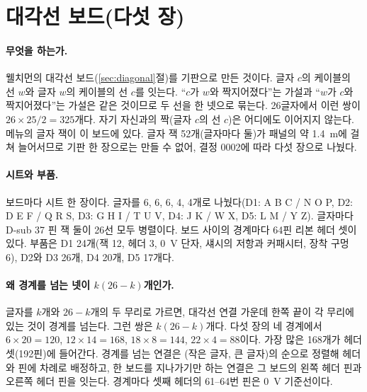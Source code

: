 
\section{대각선 보드(다섯 장)}\label{sch:diagonal}

\paragraph{무엇을 하는가.} 웰치먼의 대각선 보드(\ref{sec:diagonal}절)를 기판으로 만든 것이다. 글자 $c$의 케이블의
선 $w$와 글자 $w$의 케이블의 선 $c$를 잇는다. ``$c$가 $w$와 짝지어졌다''는 가설과 ``$w$가 $c$와 짝지어졌다''는 가설은
같은 것이므로 두 선을 한 넷으로 묶는다. 26글자에서 이런 쌍이 $26 \times 25 / 2 = 325$개다. 자기 자신과의 짝(글자 $c$의
선 $c$)은 어디에도 이어지지 않는다. 메뉴의 글자 잭이 이 보드에 있다. 글자 잭 52개(글자마다 둘)가 패널의 약 1.4~m에
걸쳐 늘어서므로 기판 한 장으로는 만들 수 없어, 결정 0002에 따라 다섯 장으로 나눴다.

\paragraph{시트와 부품.} 보드마다 시트 한 장이다. 글자를 6, 6, 6, 4, 4개로 나눴다(D1: A B C / N O P, D2: D E F / Q R
S, D3: G H I / T U V, D4: J K / W X, D5: L M / Y Z). 글자마다 D-sub 37 핀 잭 둘이 26선 모두 병렬이다. 보드 사이의
경계마다 64핀 리본 헤더 셋이 있다. 부품은 D1 24개(잭 12, 헤더 3, 0~V 단자, 섀시의 저항과 커패시터, 장착 구멍 6),
D2와 D3 26개, D4 20개, D5 17개다.

\paragraph{왜 경계를 넘는 넷이 $k(26-k)$개인가.} 글자를 $k$개와 $26-k$개의 두 무리로 가르면, 대각선 연결 가운데
한쪽 끝이 각 무리에 있는 것이 경계를 넘는다. 그런 쌍은 $k(26-k)$개다. 다섯 장의 네 경계에서 $6 \times 20 = 120$,
$12 \times 14 = 168$, $18 \times 8 = 144$, $22 \times 4 = 88$이다. 가장 많은 168개가 헤더 셋(192핀)에 들어간다.
경계를 넘는 연결은 (작은 글자, 큰 글자)의 순으로 정렬해 헤더와 핀에 차례로 배정하고, 한 보드를 지나가기만 하는
연결은 그 보드의 왼쪽 헤더 핀과 오른쪽 헤더 핀을 잇는다. 경계마다 셋째 헤더의 61--64번 핀은 0~V 기준선이다.

